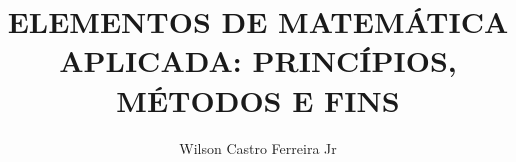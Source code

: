 \documentclass[
article,			%
11pt,				%
oneside,			%
a4paper,			%
english,			%
brazil,				%
sumario=tradicional
]{abntex2}
\title{ELEMENTOS DE MATEMÁTICA APLICADA: PRINCÍPIOS, MÉTODOS E FINS}
\author{Wilson Castro Ferreira Jr}
\begin{document}
\begin{sansmath}
\helveticafamily
\def\normalfont{\helveticafamily}










\end{sansmath}
\end{document}

